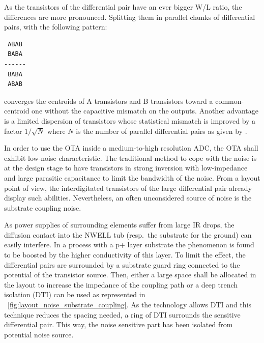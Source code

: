 As the transistors of the differential pair have an ever bigger W/L ratio, the differences are more pronounced. Splitting them in parallel chunks of differential pairs, with the following pattern:
\begin{vbox}
    \begin{verbatim}
 ABAB
 BABA
------
 BABA
 ABAB
    \end{verbatim}
    \vspace{-2em}
\end{vbox}
converges the centroids of A transistors and B transistors toward a common-centroid one without the capacitive mismatch on the outputs. Another advantage is a limited dispersion of transistors whose statistical mismatch is improved by a factor \(1/\sqrt{N}\) where \(N\) is the number of parallel differential pairs as given by \cite{Conti2002}.

In order to use the OTA inside a medium-to-high resolution ADC, the OTA shall exhibit low-noise characteristic. The traditional method to cope with the noise is at the design stage to have transistors in strong inversion with low-impedance and large parasitic capacitance to limit the bandwidth of the noise. From a layout point of view, the interdigitated transistors of the large differential pair already display such abilities. Nevertheless, an often unconsidered source of noise is the substrate coupling noise.

As power supplies of surrounding elements suffer from large IR drops, the diffusion contact into the NWELL tub (resp.\ the substrate for the ground) can easily interfere. In a process with a p+ layer substrate the phenomenon is found to be boosted by the higher conductivity of this layer. To limit the effect, the differential pairs are surrounded by a substrate guard ring connected to the potential of the transistor source. Then, either a large space shall be allocated in the layout to increase the impedance of the coupling path or a deep trench isolation (DTI) can be used as represented in \figurename~\ref{fig:layout_noise_substrate_coupling}. As the technology allows DTI and this technique reduces the spacing needed, a ring of DTI surrounds the sensitive differential pair. This way, the noise sensitive part has been isolated from potential noise source.

